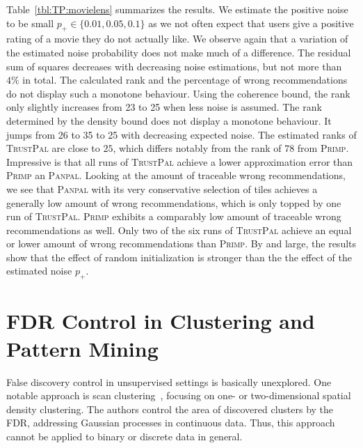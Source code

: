 Table~\ref{tbl:TP:movielens} summarizes the results. We estimate the positive noise to be small $p_+\in\{0.01,0.05,0.1\}$ as we not often expect that users give a positive rating of a movie they do not actually like. We observe again that a variation of the estimated noise probability does not make much of a difference. The residual sum of squares decreases with decreasing noise estimations, but not more than $4\%$ in total. The calculated rank and the percentage of wrong recommendations do not display such a monotone behaviour. Using the coherence bound, the rank only slightly increases from 23 to 25 when less noise is assumed. The rank determined by the density bound does not display a monotone behaviour. It jumps from 26 to 35 to 25 with decreasing expected noise. The estimated ranks of \textsc{TrustPal} are close to $25$, which differs notably from the rank of $78$ from \textsc{Primp}. Impressive is that all runs of \textsc{TrustPal} achieve a lower approximation error than \textsc{Primp} an \textsc{Panpal}. Looking at the amount of traceable wrong recommendations, we see that \textsc{Panpal} with its very conservative selection of tiles achieves a generally low amount of wrong recommendations, which is only topped by one run of \textsc{TrustPal}. \textsc{Primp} exhibits a comparably low amount of traceable wrong recommendations as well. Only two of the six runs of \textsc{TrustPal} achieve an equal or lower amount of wrong recommendations than \textsc{Primp}. By and large, the results show that the effect of random initialization is stronger than the the effect of the estimated noise $p_+$.
\section{FDR Control in Clustering and Pattern Mining}\label{sec:TP:relatedWork}
False discovery control in unsupervised settings is basically unexplored. One notable approach is scan clustering~\citep{pacifico2007scan}, focusing on one- or two-dimensional spatial density clustering. The authors control the area of discovered clusters by the FDR, addressing Gaussian processes in continuous data. Thus, this approach cannot be applied to binary or discrete data in general.  

